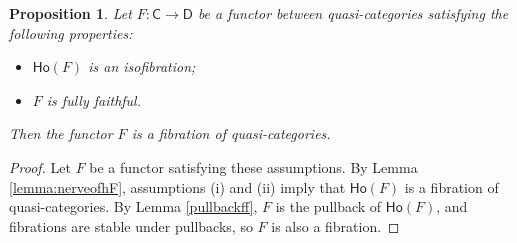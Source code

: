 \documentclass[a4paper,12pt]{amsart}
\newcommand{\ho}[1]{\mathsf{Ho}(#1)}
\theoremstyle{plain}
\newtheorem{proposition}[theorem]{Proposition}%
\theoremstyle{definition}
\theoremstyle{remark}
\begin{document}
\begin{proposition}\label{prop:fibrationff}
Let $F:\mathsf{C}\rightarrow\mathsf{D}$ be a functor between quasi-categories satisfying the following properties:
\begin{itemize}
\item[(i)] $\ho{F}$ is an isofibration;

\item[(ii)] $F$ is fully faithful.

\end{itemize}
Then the functor $F$ is a fibration of quasi-categories.
\end{proposition}
\begin{proof}
Let $F$ be a functor satisfying these assumptions. By Lemma \ref{lemma:nerveofhF}, assumptions (i) and (ii) imply that $\ho{F}$ is a fibration of quasi-categories. By Lemma \ref{pullbackff}, $F$ is the pullback of $\ho{F}$, and fibrations are stable under pullbacks, so $F$ is also a fibration. 
\end{proof}
\end{document}
